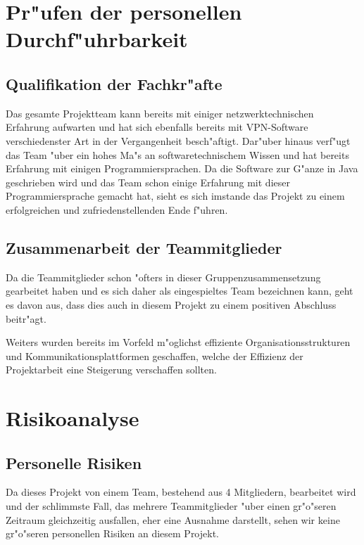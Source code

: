 \documentclass[a4paper,12pt]{scrreprt}
\begin{document}
	\section{Pr"ufen der personellen Durchf"uhrbarkeit}
		
		\subsection{Qualifikation der Fachkr"afte}
		
	Das gesamte Projektteam kann bereits mit einiger netzwerktechnischen Erfahrung aufwarten und hat sich ebenfalls bereits mit VPN-Software verschiedenster Art in der Vergangenheit besch"aftigt. Dar"uber hinaus verf"ugt das Team "uber ein hohes Ma"s an softwaretechnischem Wissen und hat bereits Erfahrung mit einigen Programmiersprachen. Da die Software zur G"anze in Java geschrieben wird und das Team schon einige Erfahrung mit dieser Programmiersprache gemacht hat, sieht es sich imstande das Projekt zu einem erfolgreichen und zufriedenstellenden Ende f"uhren.
	
		
		\subsection{Zusammenarbeit der Teammitglieder}
		
		
	Da die Teammitglieder schon "ofters in dieser Gruppenzusammensetzung gearbeitet haben und es sich daher als eingespieltes Team bezeichnen kann, geht es davon aus, dass dies auch in diesem Projekt zu einem positiven Abschluss beitr"agt.
	
	Weiters wurden bereits im Vorfeld m"oglichst effiziente Organisationsstrukturen und Kommunikationsplattformen geschaffen, welche der Effizienz der Projektarbeit eine Steigerung verschaffen sollten.
	
			
	\section{Risikoanalyse}
		
		\subsection{Personelle Risiken}
	Da dieses Projekt von einem Team, bestehend aus 4 Mitgliedern, bearbeitet wird und der schlimmste Fall, das mehrere Teammitglieder "uber einen gr"o"seren Zeitraum gleichzeitig ausfallen, eher eine  Ausnahme darstellt, sehen wir keine gr"o"seren personellen Risiken an diesem Projekt.
	
\end{document}
